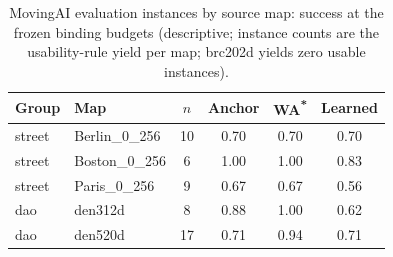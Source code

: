 \documentclass[letterpaper]{article} %
\begin{document}
\begin{table}[t]
\centering
\small
\setlength{\tabcolsep}{3pt}
\begin{tabular}{@{}llcccc@{}}
\toprule
Group & Map & $n$ & Anchor & WA\textsuperscript{*} & Learned \\
\midrule
street & Berlin\_0\_256 & 10 & 0.70 & 0.70 & 0.70 \\
street & Boston\_0\_256 & 6 & 1.00 & 1.00 & 0.83 \\
street & Paris\_0\_256 & 9 & 0.67 & 0.67 & 0.56 \\
dao & den312d & 8 & 0.88 & 1.00 & 0.62 \\
dao & den520d & 17 & 0.71 & 0.94 & 0.71 \\
\bottomrule
\end{tabular}
\caption{MovingAI evaluation instances by source map: success at the frozen binding budgets (descriptive; instance counts are the usability-rule yield per map; brc202d yields zero usable instances).}
\label{tab:maimaps}
\end{table}
\end{document}
